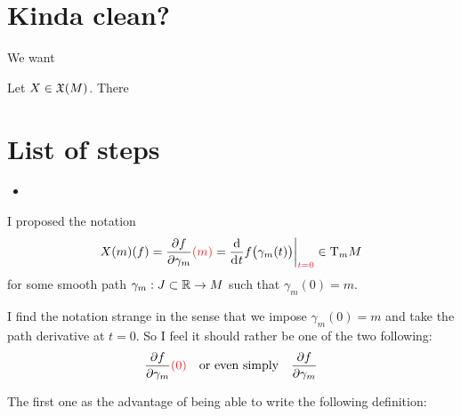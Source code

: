 \section{Kinda clean?}

	We want

	\begin{lemma}
		Let $X \in \mathfrak{X}(M)$. There 
	\end{lemma}

\section{List of steps}
	
	\begin{itemize}
		\item 
	\end{itemize}

	I proposed the notation
	$$
		X(m)(f) = \frac{\partial{f}}{\partial{\gamma_m}}{\color{Red}(m)} = \frac{\d}{\di{t}} f\big( \gamma_m(t) \big) \bigg|_{\color{Red}t=0} \in \T_m{M}
	$$
	for some smooth path $\gamma_m: J \subset \mathbb{R} \to M$ such that $\gamma_m(0) = m$.

	I find the notation strange in the sense that we impose $\gamma_m(0) = m$ and take the path derivative at $t=0$. So I feel it should rather be one of the two following:
	$$
		\frac{\partial{f}}{\partial{\gamma_m}}{\color{Red}(0)} \quad \text{or even simply} \quad \frac{\partial{f}}{\partial{\gamma_m}}
	$$

	The first one as the advantage of being able to write the following definition:

